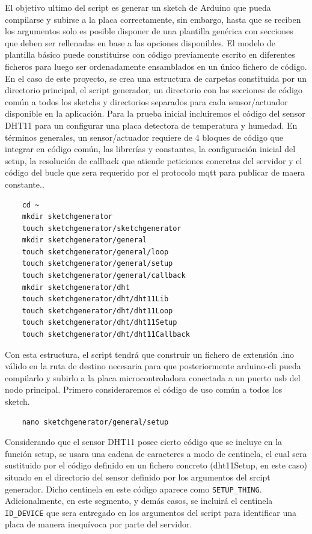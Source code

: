 El objetivo ultimo del \gls{script} es generar un \gls{sketch} de Arduino que pueda compilarse y subirse a la placa correctamente, sin embargo, hasta que se reciben los argumentos solo es posible disponer de una plantilla genérica con secciones que deben ser rellenadas en base a las opciones disponibles. El modelo de plantilla básico puede constituirse con código previamente escrito en diferentes ficheros para luego ser ordenadamente ensamblados en un único fichero de código. En el caso de este proyecto, se crea una estructura de carpetas constituida por un directorio principal, el script generador, un directorio con las secciones de código común a todos los sketchs y directorios separados para cada sensor/actuador disponible en la aplicación. Para la prueba inicial incluiremos el código del sensor DHT11 para un configurar una placa detectora de temperatura y humedad. En términos generales, un sensor/actuador requiere de 4 bloques de código que integrar en código común, las librerías y constantes, la configuración inicial del setup, la resolución de callback que atiende peticiones concretas del servidor y el código del bucle que sera requerido por el protocolo \gls{mqtt} para publicar de maera constante..

\begin{verbatim}
    cd ~
    mkdir sketchgenerator
    touch sketchgenerator/sketchgenerator
    mkdir sketchgenerator/general
    touch sketchgenerator/general/loop
    touch sketchgenerator/general/setup
    touch sketchgenerator/general/callback
    mkdir sketchgenerator/dht
    touch sketchgenerator/dht/dht11Lib
    touch sketchgenerator/dht/dht11Loop
    touch sketchgenerator/dht/dht11Setup
    touch sketchgenerator/dht/dht11Callback
\end{verbatim}

Con esta estructura, el \gls{script} tendrá que construir un fichero de extensión .ino válido en la ruta de destino necesaria para que posteriormente arduino-cli pueda compilarlo y subirlo a la placa microcontroladora conectada a un puerto \gls{usb} del nodo principal. Primero consideraremos el código de uso común a todos los \gls{sketch}.

\begin{verbatim}
    nano sketchgenerator/general/setup
\end{verbatim}

Considerando que el sensor DHT11 posee cierto código que se incluye en la función setup, se usara una cadena de caracteres a modo de centinela, el cual sera sustituido por el código definido en un fichero concreto (dht11Setup, en este caso) situado en el directorio del sensor definido por los argumentos del srcipt generador. Dicho centinela en este código aparece como \verb|SETUP_THING|. Adicionalmente, en este segmento, y demás casos, se incluirá el centinela \verb|ID_DEVICE| que sera entregado en los argumentos del script para identificar una placa de manera inequívoca por parte del servidor.

